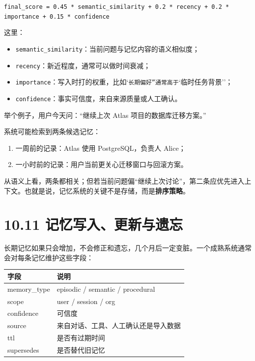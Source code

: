 \texttt{final\_score = 0.45 * semantic\_similarity + 0.2 * recency + 0.2 * importance + 0.15 * confidence}


这里：


\begin{itemize}[leftmargin=2em]
\item \texttt{semantic\_similarity}：当前问题与记忆内容的语义相似度；
\item \texttt{recency}：新近程度，通常可以做时间衰减；
\item \texttt{importance}：写入时打的权重，比如`\texttt{长期偏好''通常高于}`临时任务背景''；
\item \texttt{confidence}：事实可信度，来自来源质量或人工确认。
\end{itemize}

举个例子，用户今天问：``继续上次 Atlas 项目的数据库迁移方案。''

系统可能检索到两条候选记忆：


\begin{enumerate}[leftmargin=2em]
\item 一周前的记录：Atlas 使用 PostgreSQL，负责人 Alice；
\item 一小时前的记录：用户当前更关心迁移窗口与回滚方案。
\end{enumerate}

从语义上看，两条都相关；但若当前问题偏``继续上次讨论''，第二条应优先进入上下文。也就是说，记忆系统的关键不是存储，而是\textbf{排序策略}。


\section{10.11 记忆写入、更新与遗忘}

长期记忆如果只会增加，不会修正和遗忘，几个月后一定变脏。一个成熟系统通常会对每条记忆维护这些字段：


\begingroup
\scriptsize
\setlength{\tabcolsep}{3pt}
\begin{longtable}{|p{}|p{}|}
\hline
字段 & 说明 \\ \hline
memory\_type & episodic / semantic / procedural \\ \hline
scope & user / session / org \\ \hline
confidence & 可信度 \\ \hline
source & 来自对话、工具、人工确认还是导入数据 \\ \hline
ttl & 是否有过期时间 \\ \hline
supersedes & 是否替代旧记忆 \\ \hline
\end{longtable}
\endgroup

